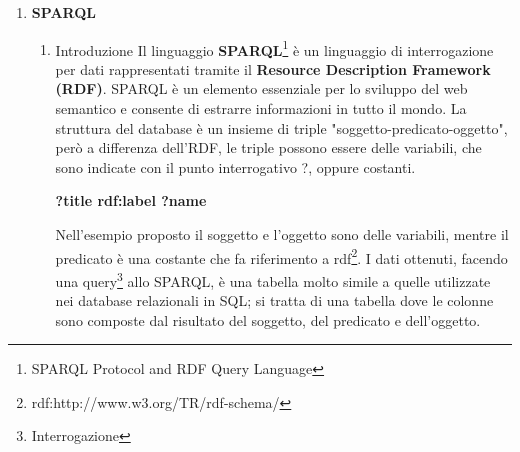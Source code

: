 \documentclass[a4paper,11pt]{article}
\begin{document}
\begin{enumerate}
\begin{enumerate}[label*=\arabic*.]
\begin{figure}[htb]
\begin{lstlisting}[language=HTML, basicstyle=\large]
<body>		
<div id='map'>
<script type="text/javascript">
var map=L.map('map')setView([37.583,14.071],9);
L.tileLayer('https://{s}.tiles.mapbox.com/v3/{id}/{z}/{x}/{y}.png',{
        maxZoom: 18,
        attribution: 'Map data &copy; 
  <a href="http://openstreetmap.org">OpenStreetMap</a> contributors,'+
  '<a href="http://creativecommons.org/licenses/by-sa/2.0/">CC-BY-SA</a>,'+
	'Imagery c <a href="http://mapbox.com">Mapbox</a>',
	id: 'andreacostazza.ik9ap86i'
	}).addTo(map);
var iconBlue= L.icon({
	iconUrl: './icon/marker-icon.png',
	shadowUrl: './icon/marker-shadow.png',
			
	iconSize: [25,41],
	shadowSize: [41,41],
	iconAnchor:[lat,lon],
	shadowAnchor:[lat,lon],
	popupAnchor:[-25,-10]
	});
	
	var marker = L.marker([lat, lon],{icon:iconBlue});		
	marker.addTo(map);
</script>
</div>
</body>
\end{lstlisting}
\end{figure}
		\end{enumerate}
	\newpage
	\item \LARGE{\textbf{SPARQL}}
		\begin{enumerate}[label*=\arabic*.]
			\Large			
			\item {Introduzione}\newline
Il linguaggio \textbf{SPARQL}\footnote{SPARQL Protocol and RDF Query Language} è un linguaggio di interrogazione per dati rappresentati tramite il \textbf{Resource Description Framework (RDF)}.
SPARQL è un elemento essenziale per lo sviluppo del web semantico e consente di estrarre informazioni in tutto il mondo.\newline 
La struttura del database è un insieme di triple "soggetto-predicato-oggetto", però a differenza dell'RDF, le triple possono essere delle variabili, che sono indicate con il punto interrogativo ?, oppure costanti.

\begin{center}	
	\textbf{?title rdf:label ?name}
\end{center}

Nell'esempio proposto il soggetto e l'oggetto sono delle variabili, mentre il predicato è una costante che fa riferimento a rdf\footnote{rdf:http://www.w3.org/TR/rdf-schema/}.\newline
I dati ottenuti, facendo una query\footnote{Interrogazione} allo SPARQL, è una tabella molto simile a quelle utilizzate nei database relazionali in SQL; si tratta di una tabella dove le colonne sono composte dal risultato del soggetto, del predicato e dell'oggetto. 


\end{enumerate}
\end{enumerate}
\end{document}
